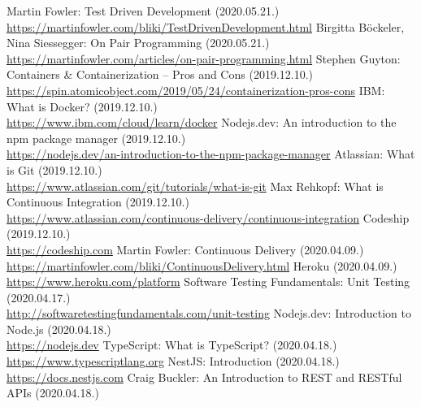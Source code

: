 \documentclass{elteikthesis}
\begin{document}
	\begin{thebibliography}{99}


			Martin Fowler: Test Driven Development (2020.05.21.)
			\\\url{https://martinfowler.com/bliki/TestDrivenDevelopment.html}
			Birgitta Böckeler, Nina Siessegger: On Pair Programming (2020.05.21.)
			\\\url{https://martinfowler.com/articles/on-pair-programming.html}
			Stephen Guyton: Containers \& Containerization – Pros and Cons (2019.12.10.)
			\\\url{https://spin.atomicobject.com/2019/05/24/containerization-pros-cons}
			IBM: What is Docker? (2019.12.10.)
			\\\url{https://www.ibm.com/cloud/learn/docker}
			Nodejs.dev: An introduction to the npm package manager (2019.12.10.)
			\\\url{https://nodejs.dev/an-introduction-to-the-npm-package-manager}
			Atlassian: What is Git (2019.12.10.)
			\\\url{https://www.atlassian.com/git/tutorials/what-is-git}
			Max Rehkopf: What is Continuous Integration (2019.12.10.)
			\\\url{https://www.atlassian.com/continuous-delivery/continuous-integration}
			Codeship (2019.12.10.)
			\\\url{https://codeship.com}
			Martin Fowler: Continuous Delivery (2020.04.09.)
			\\\url{https://martinfowler.com/bliki/ContinuousDelivery.html}
			Heroku (2020.04.09.)
			\\\url{https://www.heroku.com/platform}
			Software Testing Fundamentals: Unit Testing (2020.04.17.)
			\\\url{http://softwaretestingfundamentals.com/unit-testing}
			Nodejs.dev: Introduction to Node.js (2020.04.18.)
			\\\url{https://nodejs.dev}
			TypeScript: What is TypeScript? (2020.04.18.)
			\\\url{https://www.typescriptlang.org}
			NestJS: Introduction (2020.04.18.)
			\\\url{https://docs.nestjs.com}
			Craig Buckler: An Introduction to REST and RESTful APIs (2020.04.18.)

\end{thebibliography}
\end{document}
